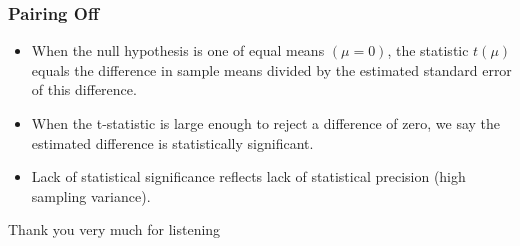 \documentclass{beamer}
\begin{document}
\begin{frame}
\frametitle{Pairing Off}
\begin{itemize}
	\item When the null hypothesis is one of equal means $(\mu = 0)$, the statistic $t(\mu)$ equals the
difference in sample means divided by the estimated standard error of this difference. \\
	\item When the t-statistic is large enough to reject a difference of zero, we say the estimated difference is statistically significant. \\
	\item Lack of statistical significance reflects lack of statistical precision (high
sampling variance).
\end{itemize}

\end{frame}

\begin{frame}
\Huge{\centerline{Thank you very much for listening}}
\end{frame}

\end{document}
